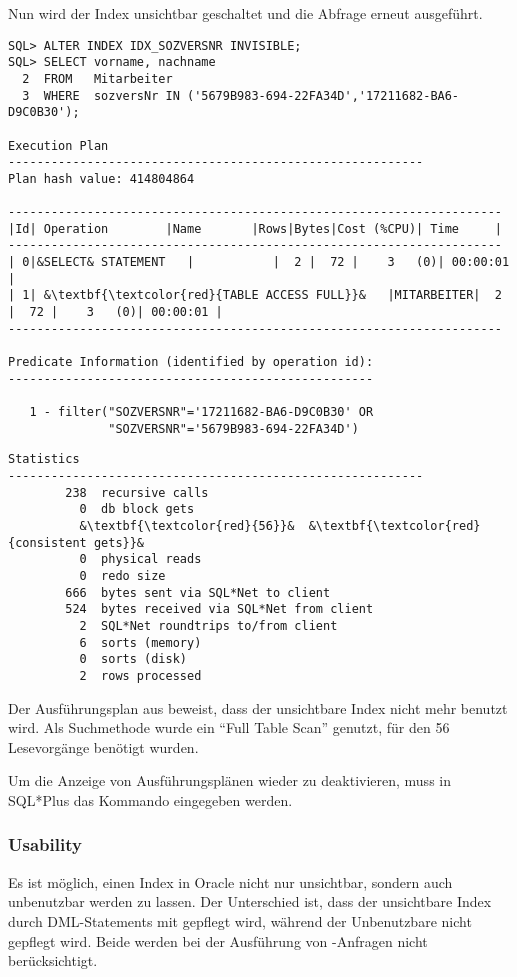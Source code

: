           Nun wird der Index unsichtbar geschaltet und die Abfrage erneut ausgeführt.
          \begin{lstlisting}[caption={Der Index wird unsichtbar und das Statement wird wiederholt},label=admin328,language=oracle_sql]
SQL> ALTER INDEX IDX_SOZVERSNR INVISIBLE;
SQL> SELECT vorname, nachname
  2  FROM   Mitarbeiter
  3  WHERE  sozversNr IN ('5679B983-694-22FA34D','17211682-BA6-D9C0B30');

Execution Plan
----------------------------------------------------------
Plan hash value: 414804864

---------------------------------------------------------------------
|Id| Operation        |Name       |Rows|Bytes|Cost (%CPU)| Time     |
---------------------------------------------------------------------
| 0|&SELECT& STATEMENT   |           |  2 |  72 |    3   (0)| 00:00:01 |
| 1| &\textbf{\textcolor{red}{TABLE ACCESS FULL}}&   |MITARBEITER|  2 |  72 |    3   (0)| 00:00:01 |
---------------------------------------------------------------------

Predicate Information (identified by operation id):
---------------------------------------------------

   1 - filter("SOZVERSNR"='17211682-BA6-D9C0B30' OR
              "SOZVERSNR"='5679B983-694-22FA34D')
          \end{lstlisting}
\clearpage
          \begin{lstlisting}[caption={Der Index wird unsichtbar und das
          Statement wird wiederholt - Fortsetzung},language=terminal]
Statistics
----------------------------------------------------------
        238  recursive calls
          0  db block gets
          &\textbf{\textcolor{red}{56}}&  &\textbf{\textcolor{red}{consistent gets}}&
          0  physical reads
          0  redo size
        666  bytes sent via SQL*Net to client
        524  bytes received via SQL*Net from client
          2  SQL*Net roundtrips to/from client
          6  sorts (memory)
          0  sorts (disk)
          2  rows processed
          \end{lstlisting}
          Der Ausführungsplan aus  beweist, dass der unsichtbare Index nicht mehr benutzt wird. Als Suchmethode wurde ein \enquote{Full Table Scan} genutzt, für den 56 Lesevorgänge benötigt wurden.

          Um die Anzeige von Ausführungsplänen wieder zu deaktivieren, muss in SQL*Plus das Kommando  eingegeben werden.
        \subsubsection{Usability}
          Es ist möglich, einen Index in Oracle nicht nur unsichtbar, sondern auch unbenutzbar werden zu lassen. Der Unterschied ist, dass der unsichtbare Index durch DML-Statements mit gepflegt wird, während der Unbenutzbare nicht gepflegt wird. Beide werden bei der Ausführung von -Anfragen nicht berücksichtigt.

